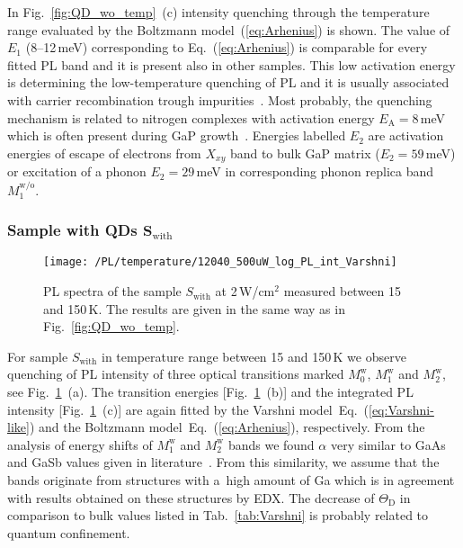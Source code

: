 In Fig.~\ref{fig:QD_wo_temp}~(c) intensity quenching through the temperature range evaluated by the Boltzmann model~(\ref{eq:Arhenius}) is shown. The value of $E_1$ (8--12$\,$meV) corresponding to Eq.~(\ref{eq:Arhenius}) is comparable for every fitted PL band and it is present also in other samples. This low activation energy is determining the low-temperature quenching of PL and it is usually associated with carrier recombination trough impurities~\cite{YuCardona}. Most probably, the quenching mechanism is related to nitrogen complexes with activation energy $E_\mathrm{A}=8$$\,$meV~\cite{ioffe} which is often present during GaP growth~\cite{Skazochkin_GaPtraps}. Energies labelled $E_2$ are activation energies of escape of electrons from $X_{xy}$ band to bulk GaP matrix ($E_2=59$$\,$meV) or excitation of a phonon $E_2=29$$\,$meV in corresponding phonon replica band $M_1^\mathrm{w/o}$. 
%



\subsubsection*{Sample with QDs $\mathbf{S_\mathrm{with}}$}
%
\begin{figure}
	\centering
	\texttt{[image: /PL/temperature/12040\_500uW\_log\_PL\_int\_Varshni]}
	\caption{PL spectra of the sample ${S_\mathrm{with}}$ at 2$\,$W/cm$^2$ measured between 15 and 150$\,$K. The results are given in the same way as in Fig.~\ref{fig:QD_wo_temp}.}
	\label{fig:QD_w_temp}
\end{figure}

For sample $S_\mathrm{with}$ in temperature range between 15 and 150$\,$K we observe quenching of PL intensity of three optical transitions marked $M_0^\mathrm{w}$, $M_1^\mathrm{w}$ and $M_2^\mathrm{w}$, see Fig.~\ref{fig:QD_w_temp}~(a). The transition energies [Fig.~\ref{fig:QD_w_temp}~(b)] and the integrated PL intensity [Fig.~\ref{fig:QD_w_temp}~(c)] are again fitted by the Varshni model~Eq.~(\ref{eq:Varshni-like}) and the Boltzmann model~Eq.~(\ref{eq:Arhenius}), respectively. %
%
From the analysis of energy shifts of $M_1^\mathrm{w}$ and $M_2^\mathrm{w}$ bands we found $\alpha$ very similar to GaAs and GaSb values given in literature~\cite{Vurgaftman}. From this similarity, we assume that the bands originate from structures with a~high amount of Ga which is in agreement with results obtained on these structures by EDX. The decrease of $\Theta_\mathrm{D}$ in comparison to bulk values listed in Tab.~\ref{tab:Varshni} is probably related to quantum confinement.

